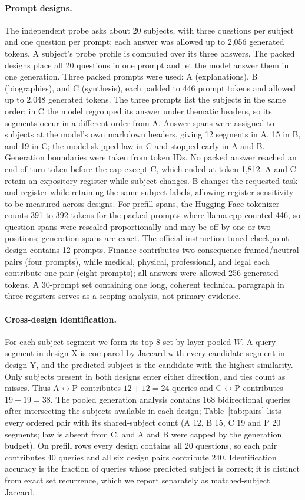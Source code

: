 \paragraph{Prompt designs.} The independent probe asks about 20 subjects, with three questions per subject and one question per prompt; each answer was allowed up to 2,056 generated tokens. A subject's probe profile is computed over its three answers. The packed designs place all 20 questions in one prompt and let the model answer them in one generation. Three packed prompts were used: A (explanations), B (biographies), and C (synthesis), each padded to 446 prompt tokens and allowed up to 2,048 generated tokens. The three prompts list the subjects in the same order; in C the model regrouped its answer under thematic headers, so its segments occur in a different order from A. Answer spans were assigned to subjects at the model's own markdown headers, giving 12 segments in A, 15 in B, and 19 in C; the model skipped law in C and stopped early in A and B. Generation boundaries were taken from token IDs. No packed answer reached an end-of-turn token before the cap except C, which ended at token 1,812. A and C retain an expository register while subject changes. B changes the requested task and register while retaining the same subject labels, allowing register sensitivity to be measured across designs. For prefill spans, the Hugging Face tokenizer counts 391 to 392 tokens for the packed prompts where llama.cpp counted 446, so question spans were rescaled proportionally and may be off by one or two positions; generation spans are exact. The official instruction-tuned checkpoint design contains 12 prompts. Finance contributes two consequence-framed/neutral pairs (four prompts), while medical, physical, professional, and legal each contribute one pair (eight prompts); all answers were allowed 256 generated tokens. A 30-prompt set containing one long, coherent technical paragraph in three registers serves as a scoping analysis, not primary evidence.

\paragraph{Cross-design identification.} For each subject segment we form its top-8 set by layer-pooled $W$. A query segment in design X is compared by Jaccard with every candidate segment in design Y, and the predicted subject is the candidate with the highest similarity. Only subjects present in both designs enter either direction, and ties count as misses. Thus A$\leftrightarrow$P contributes $12 + 12 = 24$ queries and C$\leftrightarrow$P contributes $19 + 19 = 38$. The pooled generation analysis contains 168 bidirectional queries after intersecting the subjects available in each design; Table~\ref{tab:pairs} lists every ordered pair with its shared-subject count (A 12, B 15, C 19 and P 20 segments; law is absent from C, and A and B were capped by the generation budget). On prefill rows every design contains all 20 questions, so each pair contributes 40 queries and all six design pairs contribute 240. Identification accuracy is the fraction of queries whose predicted subject is correct; it is distinct from exact set recurrence, which we report separately as matched-subject Jaccard.


